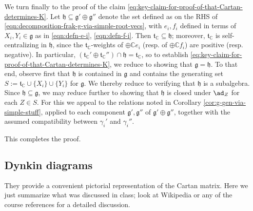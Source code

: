 \documentclass[reqno]{amsart} 
\begin{document}
We turn finally to the proof of the claim \eqref{eq:key-claim-for-proof-of-that-Cartan-determines-K}.  Let $\mathfrak{h} \subseteq \mathfrak{g} ' \oplus \mathfrak{g} ''$ denote the set defined as on the RHS of \eqref{eqn:decomposition-frak-g-via-simple-root-vecs}, with $e_i, f_i$ defined in terms of $X_i, Y_i \in \mathfrak{g}$ as in \eqref{eqn:defn-e-i}, \eqref{eqn:defn-f-i}.  Then $\mathfrak{t}_{\mathbb{C}} \subseteq \mathfrak{h}$; moreover, $\mathfrak{t}_{\mathbb{C}}$ is self-centralizing in $\mathfrak{h}$, since the $\mathfrak{t}_{\mathbb{C}}$-weights of $\oplus \mathbb{C} e_i$ (resp. of $\oplus \mathbb{C} f_i$) are positive (resp. negative).  In particular, $(\mathfrak{t}_{\mathbb{C}}' \oplus \mathfrak{t}_{\mathbb{C}} '') \cap \mathfrak{h} = \mathfrak{t}_{\mathbb{C}}$, so to establish \eqref{eq:key-claim-for-proof-of-that-Cartan-determines-K}, we reduce to showing that $\mathfrak{g} = \mathfrak{h}$.  To that end, observe first that $\mathfrak{h}$ is contained in $\mathfrak{g}$ and contains the generating set $S := \mathfrak{t}_{\mathbb{C}} \cup \{X_i\} \cup \{Y_i\}$ for $\mathfrak{g}$.  We thereby reduce to verifying that $\mathfrak{h}$ is a subalgebra.  Since $\mathfrak{h} \subseteq \mathfrak{g}$, we may reduce further to showing that $\mathfrak{h}$ is closed under $\ad_{Z}$ for each $Z \in S$.  For this we appeal to the relations noted in Corollary \ref{cor:g-gen-via-simple-stuff}, applied to each component $\mathfrak{g} ', \mathfrak{g} ''$ of $\mathfrak{g} ' \oplus \mathfrak{g} ''$, together with the assumed compatibility between $\gamma_i'$ and $\gamma_i''$.

This completes the proof.

\subsection{Dynkin diagrams}\label{sec:cnh2vo0pie}
They provide a convenient pictorial representation of the Cartan matrix.  Here we just summarize what was discussed in class; look at Wikipedia or any of the course references for a detailed discussion.
\end{document}
